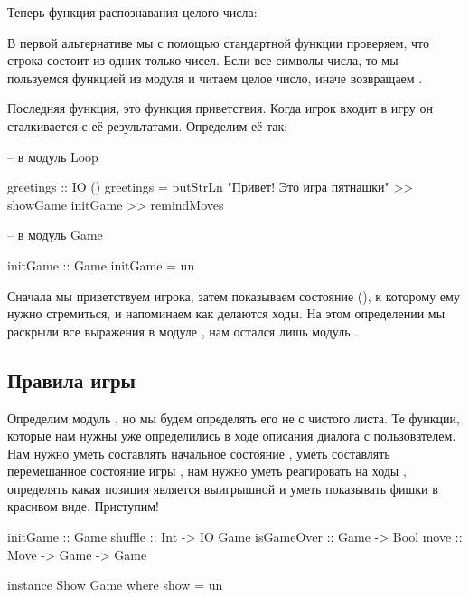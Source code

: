 Теперь функция распознавания целого числа:



В первой альтернативе мы с помощью стандартной функции
 проверяем, что строка состоит из одних
только чисел. Если все символы числа, то мы пользуемся функцией из
модуля  и читаем целое число, иначе возвращаем .

Последняя функция, это функция приветствия. Когда игрок входит в игру он
сталкивается с её результатами. Определим её так:


\begin{code}
-- в модуль Loop

greetings :: IO ()
greetings = putStrLn "Привет! Это игра пятнашки" >>
    showGame initGame >>
    remindMoves

-- в модуль Game

initGame :: Game
initGame = un
\end{code}

Сначала мы приветствуем игрока, затем показываем состояние
(), к которому ему нужно стремиться, и напоминаем как
делаются ходы. На этом определении мы раскрыли все выражения в модуле
, нам остался лишь модуль .

\subsection{Правила игры}

Определим модуль , но мы будем определять его не с чистого
листа. Те функции, которые нам нужны уже определились в ходе описания
диалога с пользователем. Нам нужно уметь составлять начальное состояние
, уметь составлять перемешанное состояние игры
, нам нужно уметь реагировать на ходы , определять
какая позиция является выигрышной  и уметь показывать
фишки в красивом виде. Приступим!


\begin{code}
initGame    :: Game
shuffle     :: Int -> IO Game
isGameOver  :: Game -> Bool
move        :: Move -> Game -> Game

instance Show Game where
    show = un
\end{code}


